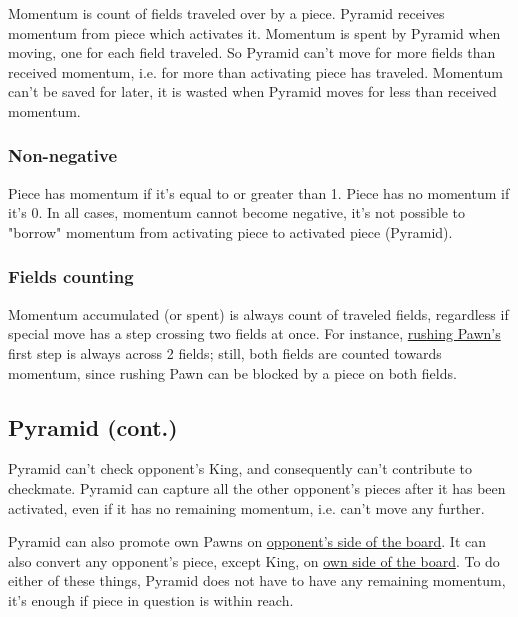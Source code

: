 Momentum is count of fields traveled over by a piece. Pyramid receives
momentum from piece which activates it. Momentum is spent by Pyramid when
moving, one for each field traveled. So Pyramid can't move for more
fields than received momentum, i.e. for more than activating piece has
traveled. Momentum can't be saved for later, it is wasted when Pyramid
moves for less than received momentum.

\subsubsection*{Non-negative}
\label{sec:Mayan Ascendancy/Pyramid/Momentum/Non-negative}

Piece has momentum if it's equal to or greater than 1. Piece has no momentum
if it's 0. In all cases, momentum cannot become negative, it's not possible
to "borrow" momentum from activating piece to activated piece (Pyramid).


\subsubsection*{Fields counting}
\label{sec:Mayan Ascendancy/Pyramid/Momentum/Fields counting}

Momentum accumulated (or spent) is always count of traveled fields, regardless
if special move has a step crossing two fields at once. For instance,
\hyperref[fig:04_croatian_ties_en_passant]{rushing Pawn's} first step is always
across 2 fields; still, both fields are counted towards momentum, since rushing
Pawn can be blocked by a piece on both fields.

\subsection*{Pyramid (cont.)}
\label{sec:Mayan Ascendancy/Pyramid/Pyramid (cont.)}

Pyramid can't check opponent's King, and consequently can't contribute to
checkmate. Pyramid can capture all the other opponent's pieces after it has
been activated, even if it has no remaining momentum, i.e. can't move any
further.

Pyramid can also promote own Pawns on
\hyperref[sec:Definitions/Chessboard sides, navigation]{opponent's side of the board}.
It can also convert any opponent's piece, except King, on
\hyperref[sec:Definitions/Chessboard sides, navigation]{own side of the board}.
To do either of these things, Pyramid does not have to have any remaining
momentum, it's enough if piece in question is within reach.

